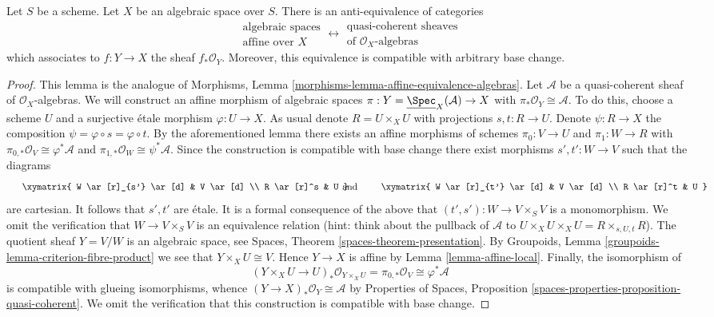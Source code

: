 \begin{lemma}
\label{lemma-affine-equivalence-algebras}
Let $S$ be a scheme. Let $X$ be an algebraic space over $S$.
There is an anti-equivalence of categories
$$
\begin{matrix}
\text{algebraic spaces} \\
\text{affine over }X
\end{matrix}
\longleftrightarrow
\begin{matrix}
\text{quasi-coherent sheaves} \\
\text{of }\mathcal{O}_X\text{-algebras}
\end{matrix}
$$
which associates to $f : Y \to X$ the sheaf $f_*\mathcal{O}_Y$.
Moreover, this equivalence is compatible with arbitrary base change.
\end{lemma}

\begin{proof}
This lemma is the analogue of Morphisms, Lemma
\ref{morphisms-lemma-affine-equivalence-algebras}.
Let $\mathcal{A}$ be a quasi-coherent sheaf of $\mathcal{O}_X$-algebras.
We will construct an affine morphism of algebraic spaces
$\pi : Y = \underline{\Spec}_X(\mathcal{A}) \to X$ with
$\pi_*\mathcal{O}_Y \cong \mathcal{A}$. To do this, choose a scheme
$U$ and a surjective \'etale morphism $\varphi : U \to X$. As usual
denote $R = U \times_X U$ with projections $s, t : R \to U$. Denote
$\psi : R \to X$ the composition $\psi = \varphi \circ s = \varphi \circ t$.
By the aforementioned lemma there exists an affine morphisms of schemes
$\pi_0 : V \to U$ and $\pi_1 : W \to R$ with
$\pi_{0, *}\mathcal{O}_V \cong \varphi^*\mathcal{A}$ and
$\pi_{1, *}\mathcal{O}_W \cong \psi^*\mathcal{A}$.
Since the construction is compatible with base change there exist
morphisms $s', t' : W \to V$ such that the diagrams
$$
\vcenter{
\xymatrix{
W \ar[r]_{s'} \ar[d] & V \ar[d] \\
R \ar[r]^s & U
}
}
\quad\text{and}\quad
\vcenter{
\xymatrix{
W \ar[r]_{t'} \ar[d] & V \ar[d] \\
R \ar[r]^t & U
}
}
$$
are cartesian. It follows that $s', t'$ are \'etale. It is a formal
consequence of the above that $(t', s') : W \to V \times_S V$ is a
monomorphism. We omit the verification that $W \to V \times_S V$ is an
equivalence relation (hint: think about the pullback of $\mathcal{A}$
to $U \times_X U \times_X U = R \times_{s, U, t} R$).
The quotient sheaf $Y = V/W$
is an algebraic space, see
Spaces, Theorem \ref{spaces-theorem-presentation}.
By Groupoids, Lemma \ref{groupoids-lemma-criterion-fibre-product}
we see that $Y \times_X U \cong V$. Hence $Y \to X$ is affine by
Lemma \ref{lemma-affine-local}. Finally, the isomorphism of
$$
(Y \times_X U \to U)_*\mathcal{O}_{Y \times_X U} =
\pi_{0, *}\mathcal{O}_V \cong \varphi^*\mathcal{A}
$$
is compatible with glueing isomorphisms, whence
$(Y \to X)_*\mathcal{O}_Y \cong \mathcal{A}$ by
Properties of Spaces, Proposition
\ref{spaces-properties-proposition-quasi-coherent}.
We omit the verification that this construction is compatible with
base change.
\end{proof}

